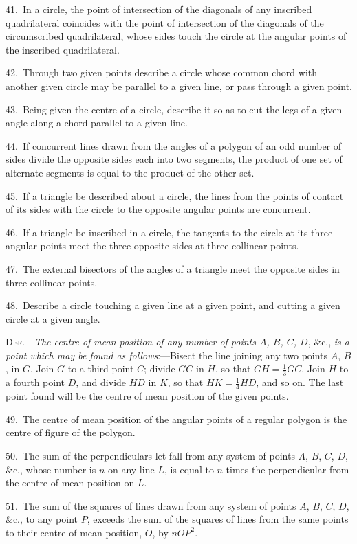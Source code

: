 \documentclass[oneside]{book}
\begin{document}
\begin{footnotesize}
41.~In a circle, the point of intersection of the diagonals of any
inscribed quadrilateral coincides with the point of intersection of
the diagonals of the circumscribed quadrilateral, whose sides touch
the circle at the angular points of the inscribed quadrilateral.

42.~Through two given points describe a circle whose common
chord with another given circle may be parallel to a given line,
or pass through a given point.

43.~Being given the centre of a circle, describe it so as to cut
the legs of a given angle along a chord parallel to a given line.

44.~If concurrent lines drawn from the angles of a polygon of
an odd number of sides divide the opposite sides each into two
segments, the product of one set of alternate segments is equal to
the product of the other set.

45.~If a triangle be described about a circle, the lines from the
points of contact of its sides with the circle to the opposite angular
points are concurrent.

46.~If a triangle be inscribed in a circle, the tangents to the
circle at its three angular points meet the three opposite sides at
three collinear points.

47.~The external bisectors of the angles of a triangle meet the
opposite sides in three collinear points.

48.~Describe a circle touching a given line at a given point,
and cutting a given circle at a given angle.

\textsc{Def.}---\textit{The centre of mean position of any number of points
$A$, $B$, $C$, $D$}, \&c., \textit{is a point which may be found as follows}:---Bisect
the line joining any two points $A$, $B$, in $G$. Join $G$ to a
third point $C$; divide $GC$ in $H$, so that $GH = \frac{1}{3} GC$. Join $H$ to a
fourth point $D$, and divide $HD$ in $K$, so that $HK = \frac{1}{4} HD$, and so
on. The last point found will be the centre of mean position of
the given points.

49.~The centre of mean position of the angular points of a
regular polygon is the centre of figure of the polygon.

50.~The sum of the perpendiculars let fall from any system of
points $A$, $B$, $C$, $D$, \&c., whose number is $n$ on any line $L$, is equal
to $n$ times the perpendicular from the centre of mean position
on $L$.

51.~The sum of the squares of lines drawn from any system of
points $A$, $B$, $C$, $D$, \&c., to any point $P$, exceeds the sum of the
squares of lines from the same points to their centre of mean
position, $O$, by $nOP^{2}$.


\end{footnotesize}
\end{document}

